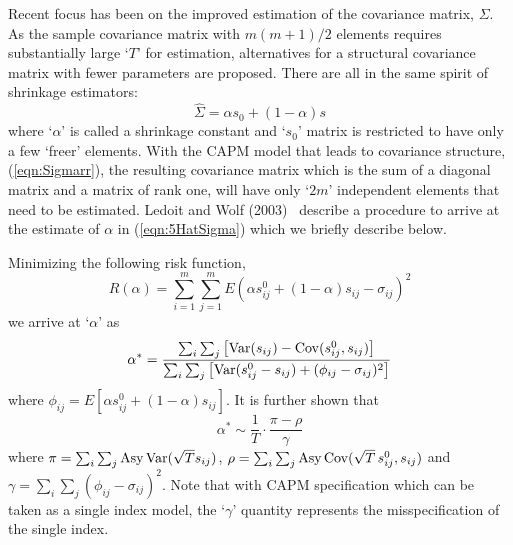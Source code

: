 Recent focus has been on the improved estimation of the covariance matrix, $\Sigma$. As the sample covariance matrix with $m(m+1)/2$ elements requires substantially large `$T$' for estimation, alternatives for a structural covariance matrix with fewer parameters are proposed. There are all in the same spirit of shrinkage estimators:
	\begin{equation}\label{eqn:5HatSigma}
	\hat{\Sigma}= \alpha s_0 + (1-\alpha)s
	\end{equation}
where `$\alpha$' is called a shrinkage constant and `$s_0$' matrix is restricted to have only a few `freer' elements. With the CAPM model that leads to covariance structure, (\ref{eqn:Sigmarr}), the resulting covariance matrix which is the sum of a diagonal matrix and a matrix of rank one, will have only `$2m$' independent elements that need to be estimated. Ledoit and Wolf (2003)~\cite{wolf} describe a procedure to arrive at the estimate of $\alpha$ in (\ref{eqn:5HatSigma}) which we briefly describe below. 


Minimizing the following risk function,
	\begin{equation}\label{eqn:ralpha}
	R(\alpha)= \sum_{i=1}^m \sum_{j=1}^m E(\alpha s_{ij}^0 + (1-\alpha) s_{ij} - \sigma_{ij})^2
	\end{equation}
we arrive at `$\alpha$' as
	\begin{equation}\label{eqn:bigalpha}
	\alpha^*= \dfrac{\sum_i \sum_{j} \left[ \Var(s_{ij}) - \Cov(s_{ij}^0, s_{ij}) \right]}{\sum_i \sum_j \left[ \Var(s_{ij}^0 - s_{ij}) + (\phi_{ij} - \sigma_{ij})^2 \right]}
	\end{equation}
where $\phi_{ij}=E[\alpha s_{ij}^0 + (1-\alpha)s_{ij}]$. It is further shown that
	\begin{equation}\label{eqn:alphastarsim}
	\alpha^* \sim \dfrac{1}{T} \cdot \dfrac{\pi - \rho}{\gamma}
	\end{equation}
where $\pi= \sum_i \sum_j \text{Asy}\operatorname{Var}(\sqrt{T}s_{ij})$, $\rho=\sum_i \sum_j \text{Asy}\operatorname{Cov}(\sqrt{T}\,s_{ij}^0, s_{ij})$ and $\gamma=\sum_i \sum_j (\phi_{ij} - \sigma_{ij})^2$. Note that with CAPM specification which can be taken as a single index model, the `$\gamma$' quantity represents the misspecification of the single index. 


